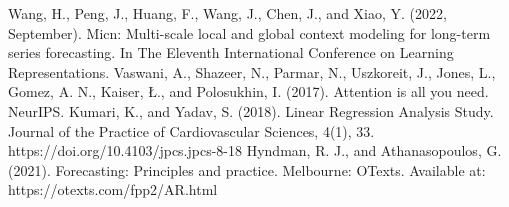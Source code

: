 \documentclass{ieeeojies}
\begin{document}
\begin{thebibliography}{00}
 Wang, H., Peng, J., Huang, F., Wang, J., Chen, J., and Xiao, Y. (2022, September). Micn: Multi-scale local and global context modeling for long-term series forecasting. In The Eleventh International Conference on Learning Representations.
 Vaswani, A., Shazeer, N., Parmar, N., Uszkoreit, J., Jones, L., Gomez, A. N., Kaiser, Ł., and Polosukhin, I. (2017). Attention is all you need. NeurIPS.
 Kumari, K., and Yadav, S. (2018). Linear Regression Analysis Study. Journal of the Practice of Cardiovascular Sciences, 4(1), 33. https://doi.org/10.4103/jpcs.jpcs-8-18
 Hyndman, R. J., and Athanasopoulos, G. (2021). Forecasting: Principles and practice. Melbourne: OTexts. Available at: https://otexts.com/fpp2/AR.html

\end{thebibliography}


\EOD
\end{document}
